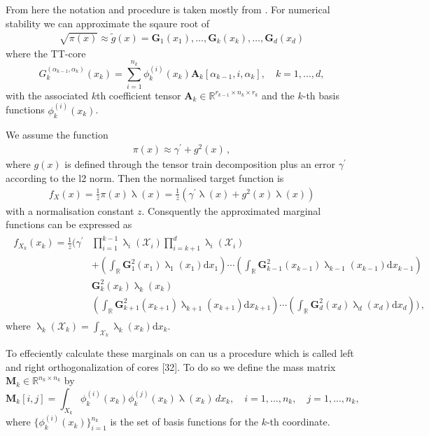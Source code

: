 From here the notation and procedure is taken mostly from \cite{}.
For numerical stability we can approximate the sqaure root of
\begin{align}
	\sqrt{\pi(x)} \approx \tilde{g}(x) = \bm{G}_1(x_1), \dots ,  \bm{G}_k(x_k), \dots ,  \bm{G}_d(x_d)
\end{align}
where the TT-core
\begin{equation}
	G^{(\alpha_{k-1},\alpha_k)}_k(x_k) = \sum_{i=1}^{n_k} \phi^{(i)}_k(x_k) \bm{A}_k[\alpha_{k-1}, i, \alpha_k], \quad k = 1, ..., d,
\end{equation}
with the associated $k$th coefficient tensor $\bm{A}_k \in \mathbb{R}^{r_{k-1} \times n_k \times r_k}$ and the $k$-th  basis functions $\phi^{(i)}_k(x_k)$.

We assume the function
\begin{align}
	\pi(x) \approx \gamma^{\prime} + g^2(x) \, ,
\end{align} 
where $g(x)$ is defined through the tensor train decomposition plus an error $\gamma^{\prime}$  according to the l2 norm.
Then the normalised target function is 
\begin{align}
	f_X(x) = \frac{1}{z} \pi(x) \uplambda(x) = \frac{1}{z} ( \gamma^{\prime} \uplambda(x) + g^2(x) \uplambda(x))
\end{align} 
with a normalisation constant $z$.
Consquently the approximated marginal functions can be expressed as
\begin{align}
	\begin{split}
		f_{X_k}(x_k) = \frac{1}{z}  \Bigg( \gamma^{\prime}& \prod_{i=1}^{k-1} \uplambda_i(\mathcal{X}_i) \prod_{i=k+1}^{d} \uplambda_i(\mathcal{X}_i) \\&+  \left( \int_{\mathbb{R}} \bm{G}^2_{1}(x_1) \uplambda_1(x_1)\text{d}x_{1} \right) \cdots \left( \int_{\mathbb{R}} \bm{G}^2_{k-1}(x_{k-1}) \uplambda_{k-1}(x_{k-1}) \text{d}x_{k-1} \right) \\ & \bm{G}^2_{k}(x_k)\uplambda_k(x_{k})\\ & \left( \int_{\mathbb{R}}  \bm{G}^2_{k+1}(x_{k+1})\uplambda_{k+1}(x_{k+1})\text{d}x_{k+1} \right) \cdots  \left( \int_{\mathbb{R}} \bm{G}^2_{d}(x_d)\uplambda_d(x_{d})\text{d}x_d \right) \Bigg) \, ,
	\end{split} 
\end{align}
where $\uplambda_k( \mathcal{X}_k) = \int_{ \mathcal{X}_k} \uplambda_k (x_k) \text{d}x_k$.

To effeciently calculate these marginals on can us a procedure which is called left and right orthogonalization of cores \cite{} [32].
To do so we define the mass matrix $\bm{M}_k \in \mathbb{R}^{n_k \times n_k}$ by
\begin{equation}
	\bm{M}_k[i, j] = \int_{X_k} \phi^{(i)}_k(x_k) \phi^{(j)}_k(x_k)  \uplambda(x_k) \,dx_k, \quad i = 1, ..., n_k, \quad j = 1, ..., n_k,
\end{equation}
where $\{\phi^{(i)}_k(x_k)\}_{i=1}^{n_k}$ is the set of basis functions for the $k$-th coordinate.




